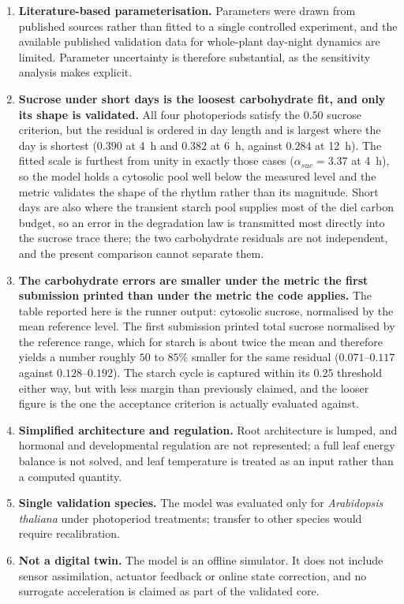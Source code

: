 \documentclass[a4paper,fleqn]{cas-sc}
\begin{document}
\begin{enumerate}
\item \textbf{Literature-based parameterisation.} Parameters were drawn from published sources rather than fitted to a single controlled experiment, and the available published validation data for whole-plant day-night dynamics are limited. Parameter uncertainty is therefore substantial, as the sensitivity analysis makes explicit.
\item \textbf{Sucrose under short days is the loosest carbohydrate fit, and only its shape is validated.} All four photoperiods satisfy the $0.50$ sucrose criterion, but the residual is ordered in day length and is largest where the day is shortest ($0.390$ at 4~h and $0.382$ at 6~h, against $0.284$ at 12~h). The fitted scale is furthest from unity in exactly those cases ($\alpha_{suc} = 3.37$ at 4~h), so the model holds a cytosolic pool well below the measured level and the metric validates the shape of the rhythm rather than its magnitude. Short days are also where the transient starch pool supplies most of the diel carbon budget, so an error in the degradation law is transmitted most directly into the sucrose trace there; the two carbohydrate residuals are not independent, and the present comparison cannot separate them.
\item \textbf{The carbohydrate errors are smaller under the metric the first submission printed than under the metric the code applies.} The table reported here is the runner output: cytosolic sucrose, normalised by the mean reference level. The first submission printed total sucrose normalised by the reference range, which for starch is about twice the mean and therefore yields a number roughly $50$ to $85\%$ smaller for the same residual ($0.071$--$0.117$ against $0.128$--$0.192$). The starch cycle is captured within its $0.25$ threshold either way, but with less margin than previously claimed, and the looser figure is the one the acceptance criterion is actually evaluated against.
\item \textbf{Simplified architecture and regulation.} Root architecture is lumped, and hormonal and developmental regulation are not represented; a full leaf energy balance is not solved, and leaf temperature is treated as an input rather than a computed quantity.
\item \textbf{Single validation species.} The model was evaluated only for \textit{Arabidopsis thaliana} under photoperiod treatments; transfer to other species would require recalibration.
\item \textbf{Not a digital twin.} The model is an offline simulator. It does not include sensor assimilation, actuator feedback or online state correction, and no surrogate acceleration is claimed as part of the validated core.
\end{enumerate}
\end{document}

